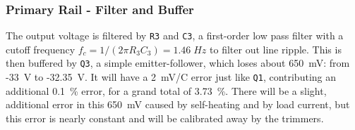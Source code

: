 \begin{multicols}{2}
\subsubsection{Primary Rail - Filter and Buffer}

The output voltage is filtered by \texttt{R3} and \texttt{C3}, a first-order
low pass filter with a cutoff frequency
$f_c = 1/(2\pi R_3 C_3) = 1.46\;Hz$ to filter out line ripple.
This is then buffered by \texttt{Q3}, a simple emitter-follower,
which loses about 650~mV: from -33~V to -32.35~V. It will have a 2~mV/\dg C
error just like \texttt{Q1}, contributing an additional 0.1~\% error, for a
grand total of 3.73~\%. There will be a slight, additional error in this
650~mV caused by self-heating and by load current, but this error is nearly
constant and will be calibrated away by the trimmers.

\end{multicols}
